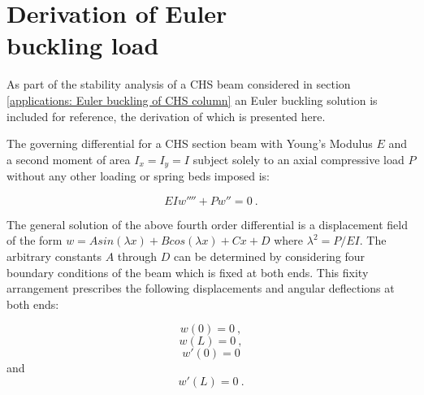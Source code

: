 \chapter[Derivation of Euler buckling load]{Derivation of Euler\\ buckling load}
\label{app:Derivation of Euler buckling load}
\renewcommand{\Thema}{Derivation of Euler buckling load}

As part of the stability analysis of a CHS beam considered in section \ref{applications: Euler buckling of CHS column} an Euler buckling solution is included for reference, the derivation of which is presented here.

The governing differential for a CHS section beam with Young's Modulus $E$  and a second moment of area $I_{x} = I_{y} = I$ subject solely to an axial compressive load $P$ without any other loading or spring beds imposed is:

\begin{equation} 
EI w'''' + Pw'' = 0
\label{eqapp4_1}\ .
\end{equation}

The general solution of the above fourth order differential is a displacement field of the form $w = Asin(\lambda x) + Bcos(\lambda x) +  Cx + D$ where $\lambda^2 = P/EI$. The arbitrary constants $A$ through $D$ can be determined by considering four boundary conditions of the beam which is fixed at both ends. This fixity arrangement prescribes the following displacements and angular deflections at both ends:

\begin{equation} 
w(0) = 0
\label{eqapp4_2}\ ,
\end{equation}
\begin{equation} 
w(L) = 0
\label{eqapp4_3}\ ,
\end{equation}
\begin{equation} 
w'(0) = 0
\label{eqapp4_4}
\end{equation}
and
\begin{equation} 
w'(L) = 0
\label{eqapp4_5}\ .
\end{equation}

